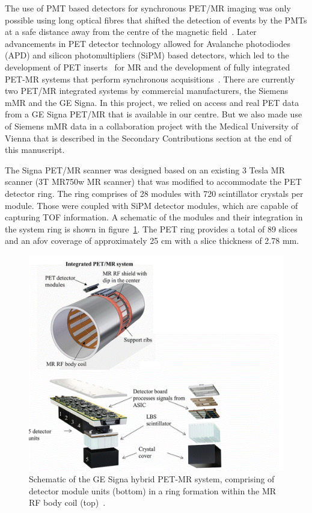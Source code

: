 The use of PMT based detectors for synchronous PET/MR imaging was only possible using long optical fibres that shifted the detection of events by the PMTs at a safe distance away from the centre of the magnetic field~\cite{Shao1997,Mackewn2010}. Later advancements in PET detector technology allowed for Avalanche photodiodes (APD) and silicon photomultipliers (SiPM) based detectors, which led to the development of PET inserts~\cite{Kolb2012} for MR and the development of fully integrated PET-MR systems that perform synchronous acquisitions~\cite{Delso2011,Grant2016,Levin2016}.
There are currently two PET/MR integrated systems by commercial manufacturers, the Siemens mMR and the GE Signa. In this project, we relied on access and real PET data from a GE Signa PET/MR that is available in our centre. But we also made use of Siemens mMR data in a collaboration project with the Medical University of Vienna that is described in the Secondary Contributions section at the end of this manuscript. 

The Signa PET/MR scanner was designed based on an existing 3 Tesla MR scanner (3T MR750w MR scanner) that was modified to accommodate the PET detector ring. The ring comprises of 28 modules with 720 scintillator crystals per module. Those were coupled with SiPM detector modules, which are capable of capturing TOF information. A schematic of the modules and their integration in the system ring is shown in figure~\ref{fig_2:SignaPETMR_Integrated_System}. The PET ring provides a total of 89 slices and an \gls{afov} coverage of approximately 25 cm with a slice thickness of 2.78 mm.

\begin{figure} [h!]
\centering
\includegraphics[scale=0.45,angle=0]{2_Theory_Methods/figures/SignaPETMR_Integrated_System.pdf}
\caption{Schematic of the GE Signa hybrid PET-MR system, comprising of detector module units (bottom) in a ring formation within the MR RF body coil (top)~\cite{Levin2016}.} 
\label{fig_2:SignaPETMR_Integrated_System}
\end{figure} 

